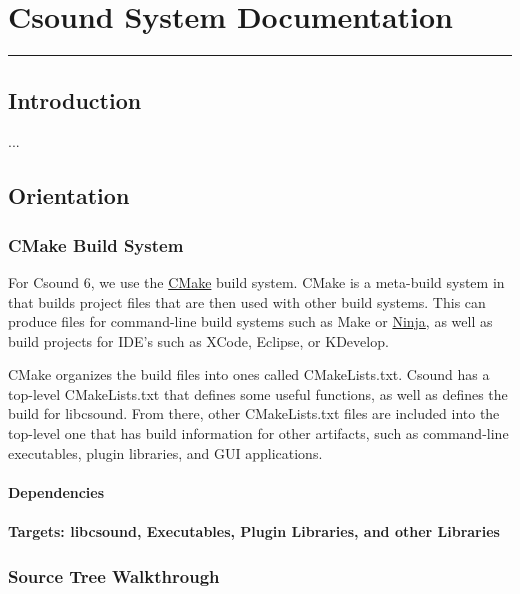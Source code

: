 \section{Csound System Documentation}

\begin{center}\rule{3in}{0.4pt}\end{center}

\subsection{Introduction}

...

\subsection{Orientation}

\subsubsection{CMake Build System}

For Csound 6, we use the \href{http://www.cmake.org}{CMake} build
system. CMake is a meta-build system in that builds project files that
are then used with other build systems. This can produce files for
command-line build systems such as Make or
\href{http://martine.github.io/ninja/}{Ninja}, as well as build projects
for IDE's such as XCode, Eclipse, or KDevelop.

CMake organizes the build files into ones called CMakeLists.txt. Csound
has a top-level CMakeLists.txt that defines some useful functions, as
well as defines the build for libcsound. From there, other
CMakeLists.txt files are included into the top-level one that has build
information for other artifacts, such as command-line executables,
plugin libraries, and GUI applications.

\paragraph{Dependencies}

\paragraph{Targets: libcsound, Executables, Plugin Libraries, and other
Libraries}

\subsubsection{Source Tree Walkthrough}

